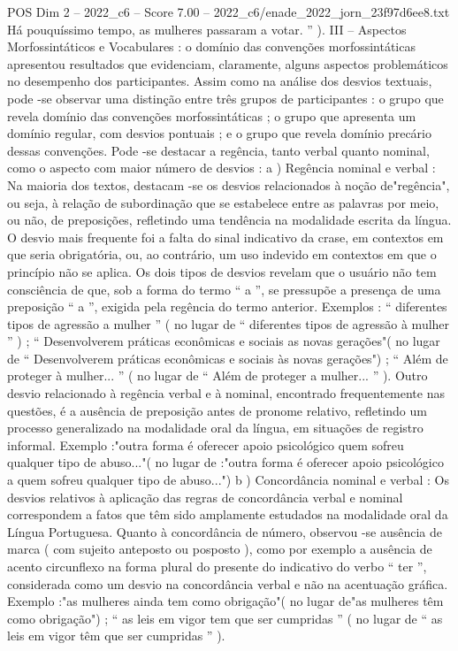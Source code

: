 \begin{textsample}{POS Dim 2 – 2022\_c6 – Score 7.00 – 2022\_c6/enade\_2022\_jorn\_23f97d6ee8.txt}
Há pouquíssimo tempo, as mulheres passaram a votar. ” ).
III – Aspectos Morfossintáticos e Vocabulares : o domínio das convenções morfossintáticas apresentou resultados que evidenciam, claramente, alguns aspectos problemáticos no desempenho dos participantes.
Assim como na análise dos desvios textuais, pode -se observar uma distinção entre três grupos de participantes : o grupo que revela domínio das convenções morfossintáticas ; o grupo que apresenta um domínio regular, com desvios pontuais ; e o grupo que revela domínio precário dessas convenções.
Pode -se destacar a regência, tanto verbal quanto nominal, como o aspecto com maior número de desvios : a ) Regência nominal e verbal : Na maioria dos textos, destacam -se os desvios relacionados à noção de"regência", ou seja, à relação de subordinação que se estabelece entre as palavras por meio, ou não, de preposições, refletindo uma tendência na modalidade escrita da língua.
O desvio mais frequente foi a falta do sinal indicativo da crase, em contextos em que seria obrigatória, ou, ao contrário, um uso indevido em contextos em que o princípio não se aplica.
Os dois tipos de desvios revelam que o usuário não tem consciência de que, sob a forma do termo “ a ”, se pressupõe a presença de uma preposição “ a ”, exigida pela regência do termo anterior.
Exemplos : “ diferentes tipos de agressão a mulher ” ( no lugar de “ diferentes tipos de agressão à mulher ” ) ; “ Desenvolverem práticas econômicas e sociais as novas gerações"( no lugar de “ Desenvolverem práticas econômicas e sociais às novas gerações") ; “ Além de proteger à mulher... ” ( no lugar de “ Além de proteger a mulher... ” ).
Outro desvio relacionado à regência verbal e à nominal, encontrado frequentemente nas questões, é a ausência de preposição antes de pronome relativo, refletindo um processo generalizado na modalidade oral da língua, em situações de registro informal.
Exemplo :"outra forma é oferecer apoio psicológico quem sofreu qualquer tipo de abuso..."( no lugar de :"outra forma é oferecer apoio psicológico a quem sofreu qualquer tipo de abuso...") b ) Concordância nominal e verbal : Os desvios relativos à aplicação das regras de concordância verbal e nominal correspondem a fatos que têm sido amplamente estudados na modalidade oral da Língua Portuguesa.
Quanto à concordância de número, observou -se ausência de marca ( com sujeito anteposto ou posposto ), como por exemplo a ausência de acento circunflexo na forma plural do presente do indicativo do verbo “ ter ”, considerada como um desvio na concordância verbal e não na acentuação gráfica.
Exemplo :"as mulheres ainda tem como obrigação"( no lugar de"as mulheres têm como obrigação") ; “ as leis em vigor tem que ser cumpridas ” ( no lugar de “ as leis em vigor têm que ser cumpridas ” ).

\end{textsample}
